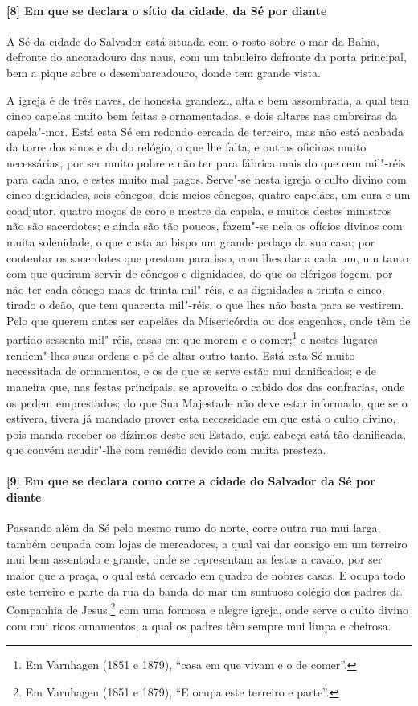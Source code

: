 \paragraph{[8] Em que se declara o sítio da cidade, da Sé por diante} \quad
A Sé da cidade do Salvador está situada com o rosto sobre o mar da Bahia, defronte do
ancoradouro das naus, com um tabuleiro defronte da porta principal, bem a pique sobre o
desembarcadouro, donde tem grande vista.

A igreja é de três naves, de honesta grandeza, alta e bem assombrada, a qual tem cinco
capelas muito bem feitas e ornamentadas, e dois altares nas ombreiras da capela"-mor. Está
esta Sé em redondo cercada de terreiro, mas não está acabada da torre dos sinos e da do
relógio, o que lhe falta, e outras oficinas muito necessárias, por ser muito pobre e não
ter para fábrica mais do que cem mil"-réis para cada ano, e estes muito mal pagos. Serve"-se
nesta igreja o culto divino com cinco dignidades, seis cônegos, dois meios cônegos, quatro
capelães, um cura e um coadjutor, quatro moços de coro e mestre da capela, e muitos destes
ministros não são sacerdotes; e ainda são tão poucos, fazem"-se nela os ofícios divinos com
muita solenidade, o que custa ao bispo um grande pedaço da sua casa; por contentar os
sacerdotes que prestam para isso, com lhes dar a cada um, um tanto com que queiram servir
de cônegos e dignidades, do que os clérigos fogem, por não ter cada cônego mais de trinta
mil"-réis, e as dignidades a trinta e cinco, tirado o deão, que tem quarenta mil"-réis, o
que lhes não basta para se vestirem. Pelo que querem antes ser capelães da Misericórdia ou
dos engenhos, onde têm de partido sessenta mil"-réis, casas em que morem e o
comer;\footnote{ Em Varnhagen (1851 e 1879), ``casa em que vivam e o de comer''.} e nestes
lugares rendem"-lhes suas ordens e pé de altar outro tanto. Está esta Sé muito necessitada
de ornamentos, e os de que se serve estão mui danificados; e de maneira que, nas festas
principais, se aproveita o cabido dos das confrarias, onde os pedem emprestados; do que
Sua Majestade não deve estar informado, que se o estivera, tivera já mandado prover esta
necessidade em que está o culto divino, pois manda receber os dízimos deste seu Estado,
cuja cabeça está tão danificada, que convém acudir"-lhe com remédio devido com muita
presteza.

\paragraph{[9] Em que se declara como corre a cidade do Salvador da Sé por diante} \quad
Passando além da Sé pelo mesmo rumo do norte, corre outra rua mui larga, também ocupada
com lojas de mercadores, a qual vai dar consigo em um terreiro mui bem assentado e grande,
onde se representam as festas a cavalo, por ser maior que a praça, o qual está cercado em
quadro de nobres casas. E ocupa todo este terreiro e parte da rua da banda do mar um
suntuoso colégio dos padres da Companhia de Jesus,\footnote{ Em Varnhagen (1851 e 1879),
``E ocupa este terreiro e parte''.} com uma formosa e alegre igreja, onde serve o culto
divino com mui ricos ornamentos, a qual os padres têm sempre mui limpa e cheirosa.


